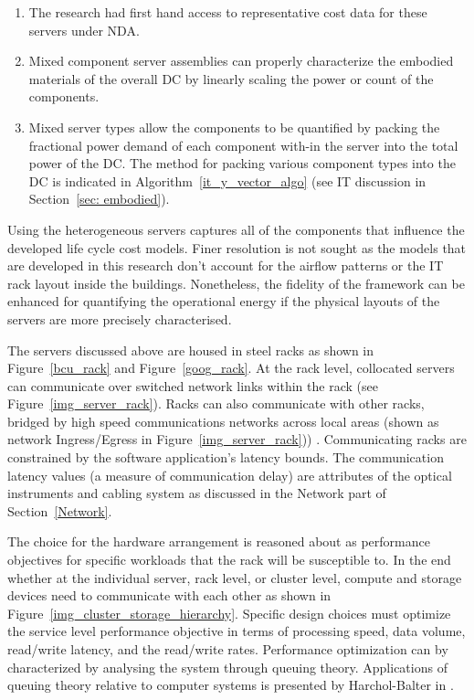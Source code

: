             \begin{enumerate}
               \item The research had first hand access to representative cost data for these servers under NDA. 
               \item Mixed component server assemblies can properly characterize the embodied materials of the overall DC by linearly scaling the power or count of the components.
               \item Mixed server types allow the components to be quantified by packing the fractional power demand of each component with-in the server into the total power of the DC. The method for packing various component types into the DC is indicated in Algorithm~\ref{it_y_vector_algo} (see IT discussion in Section~\ref{sec: embodied}).
            \end{enumerate}
             Using the heterogeneous servers captures all of the components that influence the developed life cycle cost models. Finer resolution is not sought as the models that are developed in this research don't account for the airflow patterns or the IT rack layout inside the buildings. Nonetheless, the fidelity of the framework can be enhanced for quantifying the operational energy if the physical layouts of the servers are more precisely characterised.
            
            
            The servers discussed above are housed in steel racks as shown in Figure~\ref{bcu_rack} and Figure~\ref{goog_rack}. At the rack level, collocated servers can communicate over switched network links within the rack (see Figure~\ref{img_server_rack}).  Racks can also communicate with other racks, bridged by high speed communications networks across local areas (shown as network Ingress/Egress in Figure~\ref{img_server_rack})) . Communicating racks are constrained by the software application's latency bounds. The communication latency values (a measure of communication delay) are attributes of the optical instruments and cabling system as discussed in the Network part of Section~\ref{Network}. 
            
            The choice for the hardware arrangement is reasoned about as performance objectives for specific workloads that the rack will be susceptible to. In the end whether at the individual server, rack level, or cluster level, compute and storage devices need to communicate with each other as shown in Figure~\ref{img_cluster_storage_hierarchy}. Specific design choices must optimize the service level performance objective in terms of processing speed, data volume, read/write latency, and the read/write rates. Performance optimization can by characterized by analysing the system through queuing theory. Applications of queuing theory relative to computer systems is presented by Harchol-Balter in \cite{harchol13}.
            
